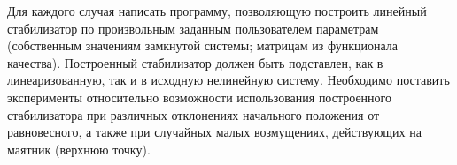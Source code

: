 Для каждого случая написать программу, позволяющую построить линейный стабилизатор по произвольным заданным пользователем параметрам (собственным значениям замкнутой системы; матрицам из функционала качества).
Построенный стабилизатор должен быть подставлен, как в линеаризованную, так и в исходную нелинейную систему.
Необходимо поставить эксперименты относительно возможности использования построенного стабилизатора при различных отклонениях начального положения от равновесного, а также при случайных малых возмущениях, действующих на маятник (верхнюю точку).